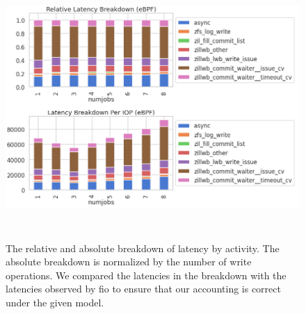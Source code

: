\documentclass[12pt,a4paper,twoside]{book}
\begin{document}
\begin{figure}[H]
    \centering
    \includegraphics[height=10cm]{fig/evaluation/zillwb_latency_analysis__relative_and_absolute_latency_breakdown}
    \caption{The relative and absolute breakdown of latency by activity.
    The absolute breakdown is normalized by the number of write operations.
    We compared the latencies in the breakdown with the latencies observed by fio to ensure that our accounting is correct under the given model.
    }
    \label{fig:lwbanalysis:breakdown_charts}
\end{figure}
\end{document}
